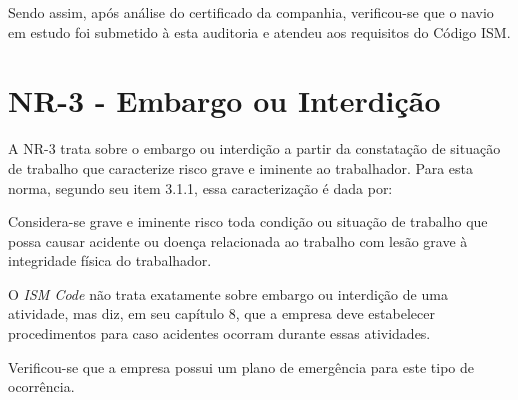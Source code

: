 Sendo assim, após análise do certificado da companhia, verificou-se que o navio em estudo foi submetido à esta auditoria e atendeu aos requisitos do Código ISM.

\section{NR-3 - Embargo ou Interdição}
A NR-3 trata sobre o embargo ou interdição a partir da constatação de situação de trabalho que caracterize risco grave e iminente ao trabalhador. Para esta norma, segundo seu item 3.1.1, essa caracterização é dada por:

\begin{citacao}
Considera-se grave e iminente risco toda condição ou situação de trabalho que possa causar acidente ou doença relacionada ao trabalho com lesão grave à integridade física do trabalhador.
\end{citacao}

O \emph{ISM Code} não trata exatamente sobre embargo ou interdição de uma atividade, mas diz, em seu capítulo 8, que a empresa deve estabelecer procedimentos para caso acidentes ocorram durante essas atividades.

Verificou-se que a empresa possui um plano de emergência para este tipo de ocorrência.
